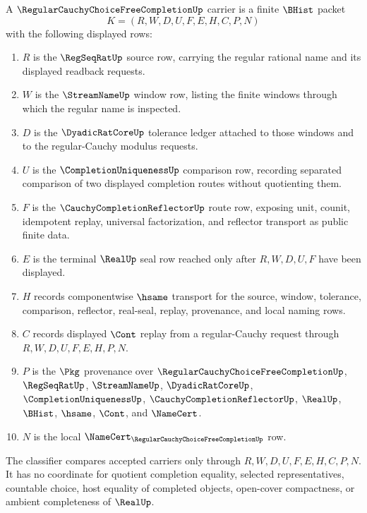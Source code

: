 \begin{definition}
\label{def:regular-cauchy-choice-free-completion-carrier}
A $\RegularCauchyChoiceFreeCompletionUp$ carrier is a finite $\BHist$ packet
$$
K=(R,W,D,U,F,E,H,C,P,N)
$$
with the following displayed rows:
\begin{enumerate}
\item $R$ is the $\RegSeqRatUp$ source row, carrying the regular rational name and its displayed readback requests.
\item $W$ is the $\StreamNameUp$ window row, listing the finite windows through which the regular name is inspected.
\item $D$ is the $\DyadicRatCoreUp$ tolerance ledger attached to those windows and to the regular-Cauchy modulus requests.
\item $U$ is the $\CompletionUniquenessUp$ comparison row, recording separated comparison of two displayed completion routes without quotienting them.
\item $F$ is the $\CauchyCompletionReflectorUp$ route row, exposing unit, counit, idempotent replay, universal factorization, and reflector transport as public finite data.
\item $E$ is the terminal $\RealUp$ seal row reached only after $R,W,D,U,F$ have been displayed.
\item $H$ records componentwise $\hsame$ transport for the source, window, tolerance, comparison, reflector, real-seal, replay, provenance, and local naming rows.
\item $C$ records displayed $\Cont$ replay from a regular-Cauchy request through $R,W,D,U,F,E,H,P,N$.
\item $P$ is the $\Pkg$ provenance over $\RegularCauchyChoiceFreeCompletionUp$, $\RegSeqRatUp$, $\StreamNameUp$, $\DyadicRatCoreUp$, $\CompletionUniquenessUp$, $\CauchyCompletionReflectorUp$, $\RealUp$, $\BHist$, $\hsame$, $\Cont$, and $\NameCert$.
\item $N$ is the local $\NameCert_{\RegularCauchyChoiceFreeCompletionUp}$ row.
\end{enumerate}
The classifier compares accepted carriers only through $R,W,D,U,F,E,H,C,P,N$. It has no coordinate for quotient completion equality, selected representatives, countable choice, host equality of completed objects, open-cover compactness, or ambient completeness of $\RealUp$.
\end{definition}

